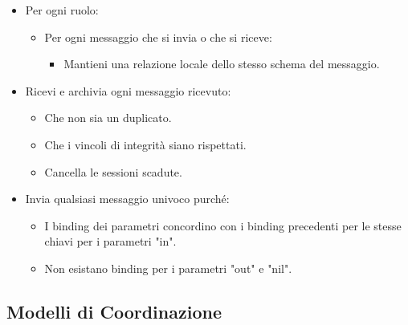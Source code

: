 \begin{itemize}
  \item Per ogni ruolo: 
    \begin{itemize}
      \item Per ogni messaggio che si invia o che si riceve: 
        \begin{itemize}
          \item Mantieni una relazione locale dello stesso schema del messaggio.
        \end{itemize}
    \end{itemize}
  \item Ricevi e archivia ogni messaggio ricevuto: 
    \begin{itemize}
      \item Che non sia un duplicato. 
      \item Che i vincoli di integrità siano rispettati. 
      \item Cancella le sessioni scadute. 
    \end{itemize}
  \item Invia qualsiasi messaggio univoco purché:
    \begin{itemize}
      \item I binding dei parametri concordino con i binding precedenti per le stesse chiavi per i parametri "in". 
      \item Non esistano binding per i parametri "out" e "nil".
    \end{itemize}
\end{itemize}


\subsection{Modelli di Coordinazione}





